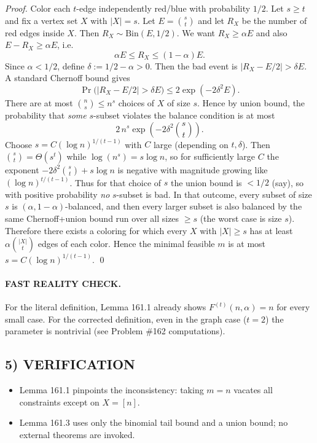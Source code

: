 \textit{Proof.}
Color each $t$-edge independently red/blue with probability $1/2$.
Let $s\ge t$ and fix a vertex set $X$ with $|X|=s$.
Let $E=\binom{s}{t}$ and let $R_X$ be the number of red edges inside $X$. Then $R_X\sim \mathrm{Bin}(E,1/2)$.
We want $R_X\ge \alpha E$ and also $E-R_X\ge \alpha E$, i.e.
\[
\alpha E\le R_X\le (1-\alpha)E.
\]
Since $\alpha<1/2$, define $\delta:=1/2-\alpha>0$. Then the bad event is $|R_X-E/2|>\delta E$.
A standard Chernoff bound gives
\[
\Pr\big(|R_X-E/2|>\delta E\big)\le 2\exp(-2\delta^2 E).
\]
There are at most $\binom{n}{s}\le n^s$ choices of $X$ of size $s$. Hence by union bound, the probability that \emph{some} $s$-subset violates the balance condition is at most
\[
2\,n^s\exp(-2\delta^2\binom{s}{t}).
\]
Choose $s=C(\log n)^{1/(t-1)}$ with $C$ large (depending on $t,\delta$). Then $\binom{s}{t}=\Theta(s^t)$ while $\log(n^s)=s\log n$, so for sufficiently large $C$ the exponent
$-2\delta^2\binom{s}{t}+s\log n$ is negative with magnitude growing like $(\log n)^{t/(t-1)}$.
Thus for that choice of $s$ the union bound is $<1/2$ (say), so with positive probability \emph{no} $s$-subset is bad. In that outcome, every subset of size $s$ is $(\alpha,1-\alpha)$-balanced, and then every larger subset is also balanced by the same Chernoff+union bound run over all sizes $\ge s$ (the worst case is size $s$).
Therefore there exists a coloring for which every $X$ with $|X|\ge s$ has at least $\alpha\binom{|X|}{t}$ edges of each color. Hence the minimal feasible $m$ is at most $s=C(\log n)^{1/(t-1)}$. \qed

\paragraph{FAST REALITY CHECK.}
For the literal definition, Lemma 161.1 already shows $F^{(t)}(n,\alpha)=n$ for every small case.
For the corrected definition, even in the graph case ($t=2$) the parameter is nontrivial (see Problem \#162 computations).

\subsection*{5) VERIFICATION}
\begin{itemize}
\item Lemma 161.1 pinpoints the inconsistency: taking $m=n$ vacates all constraints except on $X=[n]$.
\item Lemma 161.3 uses only the binomial tail bound and a union bound; no external theorems are invoked.
\end{itemize}


